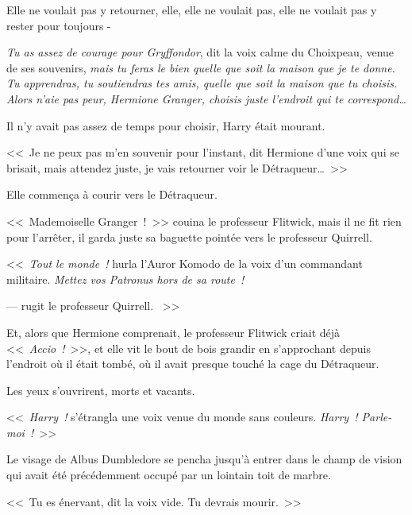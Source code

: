 Elle ne voulait pas y retourner, elle, elle ne voulait pas, elle ne voulait pas y rester pour toujours -

\emph{Tu as assez de courage pour Gryffondor}, dit la voix calme du Choixpeau, venue de ses souvenirs, \emph{mais tu feras le bien quelle que soit la maison que je te donne. Tu apprendras, tu soutiendras tes amis, quelle que soit la maison que tu choisis. Alors n'aie pas peur, Hermione Granger, choisis juste l'endroit qui te correspond…}

Il n'y avait pas assez de temps pour choisir, Harry était mourant.

<<~Je ne peux pas m'en souvenir pour l'instant, dit Hermione d'une voix qui se brisait, mais attendez juste, je vais retourner voir le Détraqueur…~>>

Elle commença à courir vers le Détraqueur.

<<~Mademoiselle Granger~!~>> couina le professeur Flitwick, mais il ne fit rien pour l'arrêter, il garda juste sa baguette pointée vers le professeur Quirrell.

<<~\emph{Tout le monde~!} hurla l'Auror Komodo de la voix d'un commandant militaire. \emph{Mettez vos Patronus hors de sa route~!}

---  rugit le professeur Quirrell. ~>>

Et, alors que Hermione comprenait, le professeur Flitwick criait déjà <<~\emph{Accio~!}~>>, et elle vit le bout de bois grandir en s'approchant depuis l'endroit où il était tombé, où il avait presque touché la cage du Détraqueur.

\later

Les yeux s'ouvrirent, morts et vacants.

<<~\emph{Harry~!} s'étrangla une voix venue du monde sans couleurs. \emph{Harry~! Parle-moi~!}~>>

Le visage de Albus Dumbledore se pencha jusqu'à entrer dans le champ de vision qui avait été précédemment occupé par un lointain toit de marbre.

<<~Tu es énervant, dit la voix vide. Tu devrais mourir.~>>

